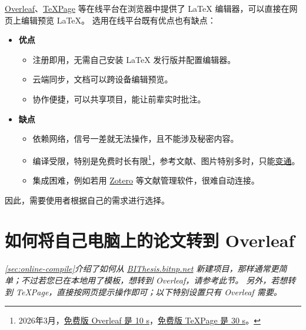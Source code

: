 \href{https://cn.overleaf.com}{Overleaf}、\href{https://www.texpage.com/zh/}{TeXPage} 等在线平台在浏览器中提供了 \LaTeX{} 编辑器，可以直接在网页上编辑预览 \LaTeX{}。
选用在线平台既有优点也有缺点：
\begin{itemize}[noitemsep]
  \item \textbf{优点}
    \begin{itemize}[noitemsep]
      \item ​​注册即用，无需自己安装 \LaTeX{} 发行版并配置编辑器。
      \item 云端同步，文档可以跨设备编辑预览。
      \item 协作便捷，可以共享项目，能让前辈实时批注。
    \end{itemize}
  \item \textbf{缺点}
    \begin{itemize}[noitemsep]
      \item 依赖网络，信号一差就无法操作，且不能涉及秘密内容。
      \item 编译受限，特别是免费时长有限\footnote{2026年3月，\href{https://cn.overleaf.com/blog/changes-to-free-compile-timeout\#:~:text=timeout\%20limit\%20to-,10\%20seconds,-.\%20We\%20made}{免费版 Overleaf 是 10 s}，\href{https://www.texpage.com/zh/pricing/}{免费版 TeXPage 是 30 s}。}，参考文献、图片特别多时，只能\href{https://bithesis.bitnp.net/faq/slow.html}{变通}。
      \item 集成困难，例如若用 \href{https://www.zotero.org}{Zotero} 等文献管理软件，很难自动连接。
    \end{itemize}
\end{itemize}

因此，需要使用者根据自己的需求进行选择。

\section{如何将自己电脑上的论文转到 Overleaf}
\label{sec:overleaf-quirks}

\textit{
\cref{sec:online-compile}介绍了如何从 \href{https://bithesis.bitnp.net}{BIThesis.bitnp.net} 新建项目，那样通常更简单；不过若您已在本地用了模板，想转到 Overleaf，请参考此节。
另外，若想转到 TeXPage，直接按网页提示操作即可；以下特别设置只有 Overleaf 需要。
}

